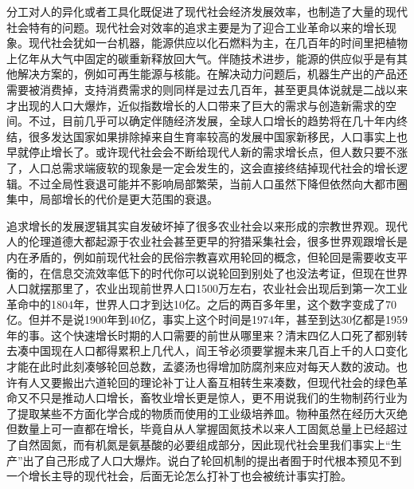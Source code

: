 \documentclass[]{tufte-book}
\newenvironment{Shaded}{}{}
\newcommand{\AttributeTok}[1]{\textcolor[rgb]{0.49,0.56,0.16}{#1}}
\newcommand{\CommentTok}[1]{\textcolor[rgb]{0.38,0.63,0.69}{\textit{#1}}}
\newcommand{\DecValTok}[1]{\textcolor[rgb]{0.25,0.63,0.44}{#1}}
\newcommand{\FunctionTok}[1]{\textcolor[rgb]{0.02,0.16,0.49}{#1}}
\newcommand{\NormalTok}[1]{#1}
\newcommand{\OtherTok}[1]{\textcolor[rgb]{0.00,0.44,0.13}{#1}}
\newcommand{\SpecialCharTok}[1]{\textcolor[rgb]{0.25,0.44,0.63}{#1}}
\newcommand{\StringTok}[1]{\textcolor[rgb]{0.25,0.44,0.63}{#1}}
\begin{document}
分工对人的异化或者工具化既促进了现代社会经济发展效率，也制造了大量的现代社会特有的问题。现代社会对效率的追求主要是为了迎合工业革命以来的增长现象。现代社会犹如一台机器，能源供应以化石燃料为主，在几百年的时间里把植物上亿年从大气中固定的碳重新释放回大气。伴随技术进步，能源的供应似乎是有其他解决方案的，例如可再生能源与核能。在解决动力问题后，机器生产出的产品还需要被消费掉，支持消费需求的则同样是过去几百年，甚至更具体说就是二战以来才出现的人口大爆炸，近似指数增长的人口带来了巨大的需求与创造新需求的空间。不过，目前几乎可以确定伴随经济发展，全球人口增长的趋势将在几十年内终结，很多发达国家如果排除掉来自生育率较高的发展中国家新移民，人口事实上也早就停止增长了。或许现代社会会不断给现代人新的需求增长点，但人数只要不涨了，人口总需求端疲软的现象是一定会发生的，这会直接终结掉现代社会的增长逻辑。不过全局性衰退可能并不影响局部繁荣，当前人口虽然下降但依然向大都市圈集中，局部增长的代价是更大范围的衰退。

追求增长的发展逻辑其实自发破坏掉了很多农业社会以来形成的宗教世界观。现代人的伦理道德大都起源于农业社会甚至更早的狩猎采集社会，很多世界观跟增长是内在矛盾的，例如前现代社会的民俗宗教喜欢用轮回的概念，但轮回是需要收支平衡的，在信息交流效率低下的时代你可以说轮回到别处了也没法考证，但现在世界人口就摆那里了，农业出现前世界人口1500万左右，农业社会出现后到第一次工业革命中的1804年，世界人口才到达10亿。之后的两百多年里，这个数字变成了70亿。但并不是说1900年到40亿，事实上这个时间是1974年，甚至到达30亿都是1959年的事。这个快速增长时期的人口需要的前世从哪里来？清末四亿人口死了都别转去凑中国现在人口都得累积上几代人，阎王爷必须要掌握未来几百上千的人口变化才能在此时此刻凑够轮回总数，孟婆汤也得增加防腐剂来应对每天人数的波动。也许有人又要搬出六道轮回的理论补丁让人畜互相转生来凑数，但现代社会的绿色革命又不只是推动人口增长，畜牧业增长更是惊人，更不用说我们的生物制药行业为了提取某些不方面化学合成的物质而使用的工业级培养皿。物种虽然在经历大灭绝但数量上可一直都在增长，毕竟自从人掌握固氮技术以来人工固氮总量上已经超过了自然固氮，而有机氮是氨基酸的必要组成部分，因此现代社会里我们事实上``生产''出了自己形成了人口大爆炸。说白了轮回机制的提出者囿于时代根本预见不到一个增长主导的现代社会，后面无论怎么打补丁也会被统计事实打脸。

\begin{Shaded}
\end{Shaded}
\end{document}
